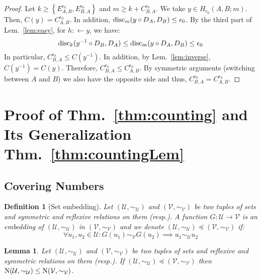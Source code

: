 \documentclass{article} %
\newtheorem{lem}{Lemma}
\newtheorem{defn}{Definition}
\newcommand{\disc}{\textnormal{disc}}
\newcommand{\Cov}{\textnormal{N}}
\begin{document}
\begin{proof} Let $k \geq \left\{ E^{\epsilon_0}_{A,B},E^{\epsilon_0}_{B,A} \right\}$ and $m \geq k+C^{\epsilon_0}_{B,A}$. We take $y \in H_{\epsilon_0}(A,B;m)$. Then, $C(y) = C^{\epsilon_0}_{A,B}$. In addition, $\disc_m(y \circ D_A,D_B) \leq \epsilon_0$. By the third part of Lem.~\ref{lem:easy}, for $h :\leftarrow y$, we have:
\begin{equation}
\disc_k(y^{-1} \circ D_B,D_A) \leq \disc_m(y \circ D_A,D_B) \leq \epsilon_0
\end{equation}
In particular, $C^{\epsilon_0}_{B,A}\leq C(y^{-1})$. In addition, by Lem.~\ref{lem:inverse}, $C(y^{-1}) = C(y)$. Therefore, $C^{\epsilon_0}_{B,A} \leq C^{\epsilon_0}_{A,B}$. By symmetric arguments (switching between $A$ and $B$) we also have the opposite side and thus, $C^{\epsilon_0}_{B,A} = C^{\epsilon_0}_{A,B}$.
\end{proof}
 

\section{Proof of Thm.~\ref{thm:counting} and Its Generalization Thm.~\ref{thm:countingLem}}
\label{app:thmproof}
\subsection{Covering Numbers}

\begin{defn}[Set embedding] Let $(\mathcal{U},\sim_\mathcal{U})$ and $(\mathcal{V},\sim_\mathcal{V})$ be two tuples of sets and symmetric and reflexive relations on them (resp.). A function $G:\mathcal{U} \rightarrow \mathcal{V}$ is an embedding of $(\mathcal{U},\sim_\mathcal{U})$ in $(\mathcal{V},\sim_{\mathcal{V}})$ and we denote $(\mathcal{U},\sim_\mathcal{U}) \preceq (\mathcal{V},\sim_{\mathcal{V}})$ if:
\begin{equation}
\forall u_1,u_2 \in \mathcal{U}: G(u_1) \sim_{\mathcal{V}} G(u_2) \implies u_1 \sim_{\mathcal{U}} u_2
\end{equation} 
\end{defn}

 

\begin{lem}\label{lem:covEmb} Let $(\mathcal{U},\sim_\mathcal{U})$ and $(\mathcal{V},\sim_\mathcal{V})$ be two tuples of sets and reflexive and symmetric relations on them (resp.). If $(\mathcal{U},\sim_\mathcal{U}) \preceq (\mathcal{V},\sim_\mathcal{V})$ then $\Cov(\mathcal{U},\sim_\mathcal{U}) \leq \Cov(\mathcal{V},\sim_\mathcal{V})$.
\end{lem}
\end{document}
